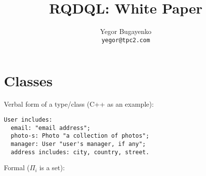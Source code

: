 \documentclass{article}
\begin{document}
\setlength{\parindent}{0pt}
\setlength{\parskip}{1em}
\newcommand{\type}[1]{\mbox{\texttt{#1}}}
\newenvironment{maths}
{
    \vspace*{0.5em}
    \begin{tabular}{l}
}
{
    \end{tabular}
    \vspace*{1em}
}

\title{RQDQL: White Paper}
\author{
    Yegor Bugayenko\\
    \texttt{yegor@tpc2.com}
}
\maketitle

\newpage
\section{Classes}

    Verbal form of a type/class (C++ as an example):

    \begin{verbatim}
User includes:
  email: "email address";
  photo-s: Photo "a collection of photos";
  manager: User "user's manager, if any";
  address includes: city, country, street.\end{verbatim}

    Formal ($\Pi_i$ is a set):
    
\end{document}
